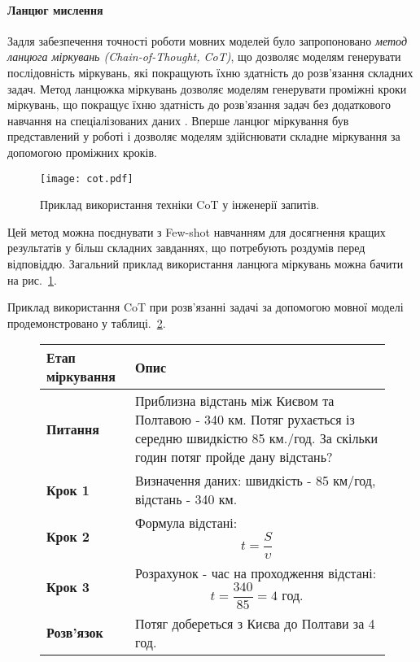 \paragraph{Ланцюг мислення}
Задля забезпечення точності роботи мовних моделей було запропоновано \emph{метод ланцюга міркувань (Chain-of-Thought, CoT)}, що дозволяє моделям генерувати послідовність міркувань, які покращують їхню здатність до розв'язання складних задач. Метод ланцюжка міркувань дозволяє моделям генерувати проміжні кроки міркувань, що покращує їхню здатність до розв'язання задач без додаткового навчання на спеціалізованих даних \cite{kojima2023largelanguagemodelszeroshot}.
Вперше ланцюг міркування був представлений у роботі \cite{wei2023chainofthoughtpromptingelicitsreasoning} і дозволяє моделям здійснювати складне міркування за допомогою проміжних кроків. 

\begin{figure}
    \centering
    \texttt{[image: cot.pdf]}
    \caption{Приклад використання техніки CoT у інженерії запитів.}
    \label{fig:cot}
\end{figure}

Цей метод можна поєднувати з Few-shot навчанням для досягнення кращих результатів у більш складних завданнях, що потребують роздумів перед відповіддю. Загальний приклад використання ланцюга міркувань можна бачити на рис.~\ref{fig:cot}.

Приклад використання CoT при розв'язанні задачі за допомогою мовної моделі продемонстровано у таблиці.~\ref{tab:train_distance}.

\begin{figure}[h]
    \centering
    \small
    \label{tab:train_distance}
    \begin{tabular}{|l|p{10cm}|}
        \hline
        \textbf{Етап міркування} & \textbf{Опис} \\
        \hline
        \textbf{Питання} & Приблизна відстань між Києвом та Полтавою - 340 км. Потяг рухається із середню швидкістю 85 км./год. За скільки годин потяг пройде дану відстань? \\
        \hline
        \textbf{Крок 1} & Визначення даних: швидкість - 85 км/год, відстань - 340 км. \\
        \hline
        \textbf{Крок 2} & Формула відстані: \[ t = \dfrac{S}{\upsilon} \] \\
        \hline
        \textbf{Крок 3} & Розрахунок - час на проходження відстані: \[ t = \dfrac{340}{85} = 4 \text{ год.}\] \\
        \hline
        \textbf{Розв'язок} & Потяг добереться з Києва до Полтави за 4 год. \\
        \hline
    \end{tabular}
\end{figure}

